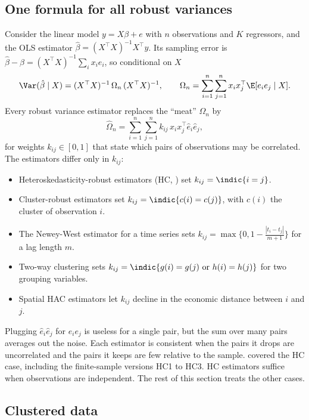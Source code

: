 \subsection{One formula for all robust variances}\label{sec:A-se-meat}

Consider the linear model $y = X\beta + e$ with $n$ observations and $K$ regressors, and the OLS estimator
$\hat\beta = (X^\top X)^{-1}X^\top y$. Its sampling error is $\hat\beta - \beta = (X^\top X)^{-1}\sum_i x_ie_i$, so
conditional on $X$
\begin{equation}\label{eq:A-sandwich-general}
  \Var(\hat\beta \mid X) = (X^\top X)^{-1}\,\Omega_n\,(X^\top X)^{-1}, \qquad
  \Omega_n = \sum_{i=1}^{n}\sum_{j=1}^{n}x_ix_j^\top\E[e_ie_j \mid X].
\end{equation}
Every robust variance estimator replaces the ``meat'' $\Omega_n$ by
\begin{equation}\label{eq:A-meat-kernel}
  \hat\Omega_n = \sum_{i=1}^{n}\sum_{j=1}^{n}k_{ij}\,x_ix_j^\top\hat e_i\hat e_j,
\end{equation}
for weights $k_{ij} \in [0, 1]$ that state which pairs of observations may be correlated. The estimators differ only
in $k_{ij}$:
\begin{itemize}
  \item Heteroskedasticity-robust estimators (HC, \citealp{White1980}) set $k_{ij} = \indic\{i = j\}$.
  \item Cluster-robust estimators set $k_{ij} = \indic\{c(i) = c(j)\}$, with $c(i)$ the cluster of observation $i$.
  \item The Newey-West estimator for a time series sets $k_{ij} = \max\{0, 1 - \frac{|t_i - t_j|}{m+1}\}$ for a lag
  length $m$.
  \item Two-way clustering sets $k_{ij} = \indic\{g(i) = g(j) \text{ or } h(i) = h(j)\}$ for two grouping variables.
  \item Spatial HAC estimators \citep{Conley1999} let $k_{ij}$ decline in the economic distance between $i$ and $j$.
\end{itemize}
Plugging $\hat e_i\hat e_j$ for $e_ie_j$ is useless for a single pair, but the sum over many pairs averages out the
noise. Each estimator is consistent when the pairs it drops are uncorrelated and the pairs it keeps are few relative
to the sample.  covered the HC case, including the finite-sample versions HC1 to HC3. HC estimators
suffice when observations are independent. The rest of this section treats the other cases.

\subsection{Clustered data}\label{sec:A-cluster}

